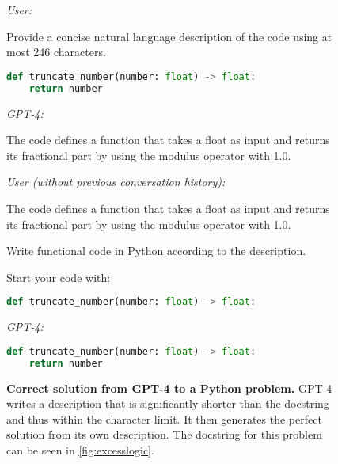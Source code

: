 \begin{figure}[htbp]
\hrulefill

\emph{User:}

\hrulefill

Provide a concise natural language description of the code using at most 246 characters.
\begin{lstlisting}[language=Python,breaklines=true,basicstyle=\ttfamily\scriptsize]
def truncate_number(number: float) -> float:
    return number \end{lstlisting}

\hrulefill

\emph{GPT-4:}

\hrulefill

The code defines a function that takes a float as input and returns its fractional part by using the modulus operator with 1.0.

\hrulefill

\emph{User (without previous conversation history):}

\hrulefill

The code defines a function that takes a float as input and returns its fractional part by using the modulus operator with 1.0.

Write functional code in Python according to the description.

Start your code with:
\begin{lstlisting}[language=Python,breaklines=true,basicstyle=\ttfamily\scriptsize]
def truncate_number(number: float) -> float:
\end{lstlisting}

\hrulefill

\emph{GPT-4:}

\hrulefill

\begin{lstlisting}[language=Python,breaklines=true,basicstyle=\ttfamily\scriptsize]
def truncate_number(number: float) -> float:
    return number \end{lstlisting}

\hrulefill
\caption{\textbf{Correct solution from GPT-4 to a \evale{} Python problem.} GPT-4 writes a description that is significantly shorter than the docstring and thus within the character limit. It then generates the perfect solution from its own description. The docstring for this problem can be seen in \autoref{fig:excesslogic}.}
\label{fig:gpt4py}
\end{figure}


